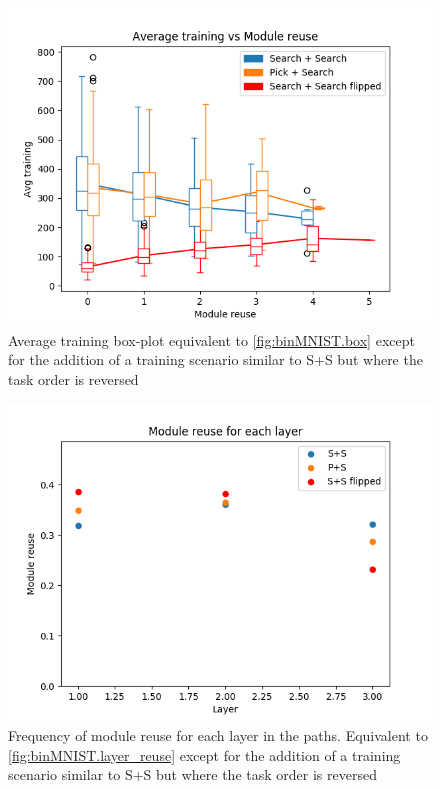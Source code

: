 \begin{figure}[t]
    \includegraphics[width=\textwidth]{Chapters/Experiments/first_path/figures/535MNIST_training_boxplot.png}
    \caption{Average training box-plot equivalent to \ref{fig:binMNIST.box} except for the addition of a training scenario similar to S+S but where the task order is reversed}
    \label{fig:quinMNIST.box}
\end{figure}

\begin{figure}[t]
    \includegraphics[width=\textwidth]{Chapters/Experiments/first_path/figures/535MNIST_reuse_by_layer.png}
    \caption{Frequency of module reuse for each layer in the paths. Equivalent to \ref{fig:binMNIST.layer_reuse} except for the addition of a training scenario similar to S+S but where the task order is reversed}
    \label{fig:quinMNIST.layer_reuse}
\end{figure}


